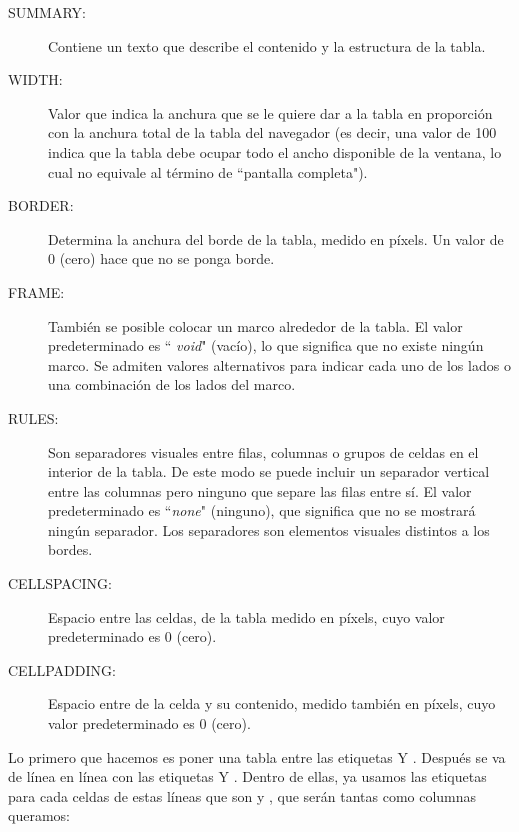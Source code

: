 \begin{description}

\item[SUMMARY:]  Contiene un  texto  que describe  el  contenido y  la
estructura de la tabla.

\item [WIDTH:] Valor que  indica la anchura que se le  quiere dar a la
tabla en proporción con la anchura total de la tabla del navegador (es
decir, una valor de 100 indica que  la tabla debe ocupar todo el ancho
disponible de la ventana, lo cual no equivale al término de ``pantalla
completa").

\item [BORDER:] Determina la anchura del  borde de la tabla, medido en
píxels. Un valor de 0 (cero) hace que no se ponga borde.

\item [FRAME:]  También se  posible colocar un  marco alrededor  de la
tabla. El  valor predeterminado es  `` \textit{void}" (vacío),  lo que
significa que no existe ningún  marco. Se admiten valores alternativos
para indicar cada uno de los lados  o una combinación de los lados del
marco.

\item [RULES:] Son separadores visuales entre filas, columnas o grupos
de celdas en el interior de la tabla. De este modo se puede incluir un
separador  vertical entre  las columnas  pero ninguno  que separe  las
filas entre sí. El valor predeterminado es ``\textit{none}" (ninguno),
que significa que no se mostrará ningún separador. Los separadores son
elementos visuales distintos a los bordes.

\item [CELLSPACING:] Espacio  entre las celdas, de la  tabla medido en
píxels, cuyo valor predeterminado es 0 (cero).

\item [CELLPADDING:] Espacio entre de  la celda y su contenido, medido
también en píxels, cuyo valor predeterminado es 0 (cero).

\end{description}

Lo  primero  que  hacemos  es  poner una  tabla  entre  las  etiquetas
 Y . Después se va  de línea en línea con las
etiquetas   Y  .  Dentro de  ellas,  ya usamos  las
etiquetas  para  cada celdas  de  estas  líneas  que son    y
, que serán tantas como columnas queramos:

